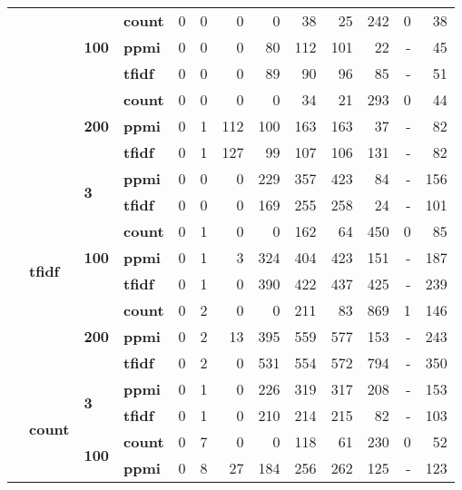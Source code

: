 \begin{table}[H]
{\begin{tabular}{llllrrrrrrrrr}
	\cline{3-4}
	 &  & \multirow[t]{3}{*}{\textbf{100}} & \textbf{count} & 0 & 0 & 0 & 0 & 38 & 25 & 242 & 0 & 38 \\
	 &  &  & \textbf{ppmi} & 0 & 0 & 0 & 80 & 112 & 101 & 22 & - & 45 \\
	 &  &  & \textbf{tfidf} & 0 & 0 & 0 & 89 & 90 & 96 & 85 & - & 51 \\
	\cline{3-4}
	 &  & \multirow[t]{3}{*}{\textbf{200}} & \textbf{count} & 0 & 0 & 0 & 0 & 34 & 21 & 293 & 0 & 44 \\
	 &  &  & \textbf{ppmi} & 0 & 1 & 112 & 100 & 163 & 163 & 37 & - & 82 \\
	 &  &  & \textbf{tfidf} & 0 & 1 & {\cellcolor{lightgreen}} 127 & 99 & 107 & 106 & 131 & - & 82 \\
	\cline{2-4} \cline{3-4}
	 & \multirow[t]{8}{*}{\textbf{tfidf}} & \multirow[t]{2}{*}{\textbf{3}} & \textbf{ppmi} & 0 & 0 & 0 & 229 & 357 & 423 & 84 & - & 156 \\
	 &  &  & \textbf{tfidf} & 0 & 0 & 0 & 169 & 255 & 258 & 24 & - & 101 \\
	\cline{3-4}
	 &  & \multirow[t]{3}{*}{\textbf{100}} & \textbf{count} & 0 & 1 & 0 & 0 & 162 & 64 & 450 & 0 & 85 \\
	 &  &  & \textbf{ppmi} & 0 & 1 & 3 & 324 & 404 & 423 & 151 & - & 187 \\
	 &  &  & \textbf{tfidf} & 0 & 1 & 0 & 390 & 422 & 437 & 425 & - & 239 \\
	\cline{3-4}
	 &  & \multirow[t]{3}{*}{\textbf{200}} & \textbf{count} & 0 & 2 & 0 & 0 & 211 & 83 & {\cellcolor{lightgreen}} 869 & {\cellcolor{lightgreen}} 1 & 146 \\
	 &  &  & \textbf{ppmi} & 0 & 2 & 13 & 395 & {\cellcolor{lightgreen}} 559 & {\cellcolor{lightgreen}} 577 & 153 & - & 243 \\
	 &  &  & \textbf{tfidf} & 0 & 2 & 0 & {\cellcolor{lightgreen}} 531 & 554 & 572 & 794 & - & {\cellcolor{lightgreen}} 350 \\
	\cline{1-4} \cline{2-4} \cline{3-4}
	\multirow[t]{24}{*}{\mfauhtcsldp} & \multirow[t]{8}{*}{\textbf{count}} & \multirow[t]{2}{*}{\textbf{3}} & \textbf{ppmi} & 0 & 1 & 0 & 226 & 319 & 317 & 208 & - & 153 \\
	 &  &  & \textbf{tfidf} & 0 & 1 & 0 & 210 & 214 & 215 & 82 & - & 103 \\
	\cline{3-4}
	 &  & \multirow[t]{3}{*}{\textbf{100}} & \textbf{count} & 0 & 7 & 0 & 0 & 118 & 61 & 230 & 0 & 52 \\
	 &  &  & \textbf{ppmi} & 0 & 8 & 27 & 184 & 256 & 262 & 125 & - & 123 \\

\end{tabular}}
\end{table}
